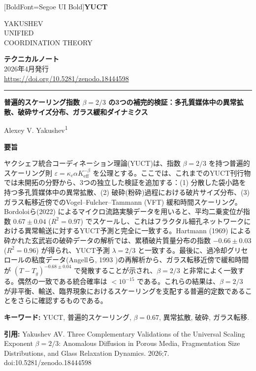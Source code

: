 \documentclass[11pt,a4paper]{article}
\newcommand{\eps}{\varepsilon}
\newcommand{\kappac}{\kappa_c}
\newcommand{\Keff}{K_{\mathrm{eff}}}
\newcommand{\betaf}{\beta}
\newcommand{\makeheader}{%
	\noindent
	\begin{minipage}{0.17\textwidth}
		\raggedright
		{\fontspec{Segoe UI}[BoldFont=Segoe UI Bold]\bfseries\color{skyblue}\fontsize{46}{46}\selectfont YUCT}%
	\end{minipage}%
	\hspace{30pt}
	\begin{minipage}{0.32\textwidth}
		\raggedright
		{\sffamily\fontsize{11}{13}\selectfont YAKUSHEV\\ UNIFIED\\ COORDINATION THEORY}%
	\end{minipage}%
	\hfill
	\begin{minipage}{0.38\textwidth}
		\raggedleft
		{\sffamily\bfseries テクニカルノート}\\
		{\sffamily 2026年4月発行}\\
		{\sffamily\footnotesize \url{https://doi.org/10.5281/zenodo.18444598}}%
	\end{minipage}
	\par\vspace{5pt}
	\noindent\textcolor{gold}{\rule{\textwidth}{1.6pt}}
	\par\vspace{0pt}
}
\begin{document}
	\thispagestyle{firstpage}
	\makeheader
	
	\vspace{0cm}
	{\LARGE\bfseries 普遍的スケーリング指数 \(\betaf = 2/3\) の3つの補完的検証：多孔質媒体中の異常拡散、破砕サイズ分布、ガラス緩和ダイナミクス \par}
	\vspace{0.2cm}
	
	{\large Alexey V. Yakushev\textsuperscript{1}} \\
	\vspace{0.0cm}
	
	{\color{darkblue}\textbf{\LARGE 要旨}} \par
	{\large
		\noindent
		ヤクシェフ統合コーディネーション理論(YUCT)は、指数 \(\betaf = 2/3\) を持つ普遍的スケーリング則 \(\eps = \kappac \alpha \Keff^{-\betaf}\) を公理とする。ここでは、これまでのYUCT刊行物では未開拓の分野から、3つの独立した検証を追加する：(1) 分散した袋小路を持つ多孔質媒体中の異常拡散、(2) 破砕(粉砕)過程における破片サイズ分布、(3) ガラス転移近傍でのVogel–Fulcher–Tammann (VFT) 緩和時間スケーリング。Bordoloiら(2022) \cite{Bordoloi2022} によるマイクロ流路実験データを用いると、平均二乗変位が指数 \(0.67 \pm 0.04\) (\(R^2 = 0.97\)) でスケールし、これはフラクタル細孔ネットワークにおける異常輸送に対するYUCT予測と完全に一致する。Hartmann (1969) \cite{Hartmann1969} による砕かれた玄武岩の破砕データの解析では、累積破片質量分布の指数 \(-0.66 \pm 0.03\) (\(R^2 = 0.96\)) が得られ、YUCT予測 \(\lambda = 2/3\) と一致する。最後に、過冷却グリセロールの粘度データ(Angellら, 1993 \cite{Angell1993})の再解析から、ガラス転移近傍で緩和時間が \((T - T_g)^{-0.68 \pm 0.04}\) で発散することが示され、\(\betaf = 2/3\) と非常によく一致する。偶然の一致である統合確率は \(< 10^{-15}\) である。これらの結果は、\(\betaf = 2/3\) が非平衡、輸送、臨界現象におけるスケーリングを支配する普遍的定数であることをさらに確認するものである。}
	
	\vspace{0.1cm}
	\noindent
	{\color{darkblue}\textbf{キーワード:}} YUCT, 普遍的スケーリング, \(\beta = 0.67\), 異常拡散, 破砕, ガラス転移.
	
	\vspace{0.1cm}
	\noindent
	{\color{darkblue}\textbf{引用:}} Yakushev AV. Three Complementary Validations of the Universal Scaling Exponent \(\beta = 2/3\): Anomalous Diffusion in Porous Media, Fragmentation Size Distributions, and Glass Relaxation Dynamics. 2026;7. doi:10.5281/zenodo.18444598
	
\end{document}
